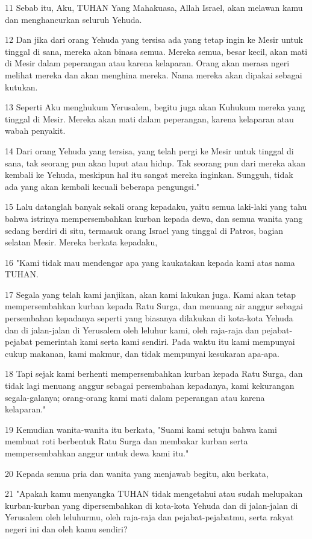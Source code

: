 \par 11 Sebab itu, Aku, TUHAN Yang Mahakuasa, Allah Israel, akan melawan kamu dan menghancurkan seluruh Yehuda.
\par 12 Dan jika dari orang Yehuda yang tersisa ada yang tetap ingin ke Mesir untuk tinggal di sana, mereka akan binasa semua. Mereka semua, besar kecil, akan mati di Mesir dalam peperangan atau karena kelaparan. Orang akan merasa ngeri melihat mereka dan akan menghina mereka. Nama mereka akan dipakai sebagai kutukan.
\par 13 Seperti Aku menghukum Yerusalem, begitu juga akan Kuhukum mereka yang tinggal di Mesir. Mereka akan mati dalam peperangan, karena kelaparan atau wabah penyakit.
\par 14 Dari orang Yehuda yang tersisa, yang telah pergi ke Mesir untuk tinggal di sana, tak seorang pun akan luput atau hidup. Tak seorang pun dari mereka akan kembali ke Yehuda, meskipun hal itu sangat mereka inginkan. Sungguh, tidak ada yang akan kembali kecuali beberapa pengungsi."
\par 15 Lalu datanglah banyak sekali orang kepadaku, yaitu semua laki-laki yang tahu bahwa istrinya mempersembahkan kurban kepada dewa, dan semua wanita yang sedang berdiri di situ, termasuk orang Israel yang tinggal di Patros, bagian selatan Mesir. Mereka berkata kepadaku,
\par 16 "Kami tidak mau mendengar apa yang kaukatakan kepada kami atas nama TUHAN.
\par 17 Segala yang telah kami janjikan, akan kami lakukan juga. Kami akan tetap mempersembahkan kurban kepada Ratu Surga, dan menuang air anggur sebagai persembahan kepadanya seperti yang biasanya dilakukan di kota-kota Yehuda dan di jalan-jalan di Yerusalem oleh leluhur kami, oleh raja-raja dan pejabat-pejabat pemerintah kami serta kami sendiri. Pada waktu itu kami mempunyai cukup makanan, kami makmur, dan tidak mempunyai kesukaran apa-apa.
\par 18 Tapi sejak kami berhenti mempersembahkan kurban kepada Ratu Surga, dan tidak lagi menuang anggur sebagai persembahan kepadanya, kami kekurangan segala-galanya; orang-orang kami mati dalam peperangan atau karena kelaparan."
\par 19 Kemudian wanita-wanita itu berkata, "Suami kami setuju bahwa kami membuat roti berbentuk Ratu Surga dan membakar kurban serta mempersembahkan anggur untuk dewa kami itu."
\par 20 Kepada semua pria dan wanita yang menjawab begitu, aku berkata,
\par 21 "Apakah kamu menyangka TUHAN tidak mengetahui atau sudah melupakan kurban-kurban yang dipersembahkan di kota-kota Yehuda dan di jalan-jalan di Yerusalem oleh leluhurmu, oleh raja-raja dan pejabat-pejabatmu, serta rakyat negeri ini dan oleh kamu sendiri?
